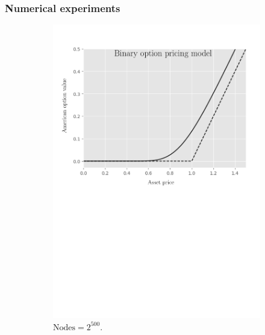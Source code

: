 \subsubsection{Numerical experiments}
\begin{figure}[H]
  \centering
  \begin{subfigure}{0.4\textwidth}
    \centering
    \includegraphics[width=\textwidth]{chapters/chapter3/TestCase1BOPM.pdf}
    \caption{$\text{Nodes} = 2^{500}$.}
    \label{fig:lcp:numericaresults:numericaresults:test_case_1_bopm}
  \end{subfigure}
  \hspace{0.5cm}
  \begin{subfigure}{0.4\textwidth}
    \centering

\end{subfigure}
\end{figure}
